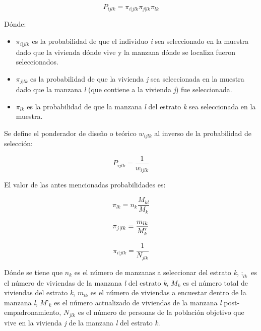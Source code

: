 \documentclass[12pt]{report}
\begin{document}
\begin{equation*}
P_{ijlk}=\pi_{i|jlk} \pi_{j|lk} \pi_{lk}
\end{equation*}

Dónde:
\begin{itemize}[noitemsep]
	\item $\pi_{i|jlk}$ es la probabilidad de que el individuo \textit{i} sea seleccionado en la muestra dado  que la vivienda dónde vive y la manzana dónde se localiza fueron seleccionados.
	\item $\pi_{j|lk}$ es la probabilidad de que la vivienda \textit{j} sea seleccionada en la muestra dado  que la manzana  \textit{l} (que contiene a la vivienda \textit{j}) fue seleccionada.
	\item $\pi_{lk}$ es la probabilidad de que la manzana \textit{l} del estrato \textit{k} sea seleccionada en la muestra.
\end{itemize}	
	
Se define el ponderador de diseño o teórico $w_{ijlk}$ al inverso de la probabilidad de selección:

\begin{equation*}
P_{ijlk}=\frac{1}{w_{ijlk}}
\end{equation*}

El valor de las antes mencionadas probabilidades es:

\begin{equation*}
\pi_{lk}=n_{k}\frac{M_{kl}}{M_{k}}
\end{equation*}	

\begin{equation*}
\pi_{j|lk}=\frac{m_{lk}}{M'_{k}}\\
\end{equation*}
	
\begin{equation*}
\pi_{i|jlk}=\frac{1}{N_{jlk}}
\end{equation*}	
	
Dónde se tiene que $n_{k}$ es el número de manzanas a seleccionar del estrato \textit{k}, $;_{lk}$ es el número de viviendas de la manzana \textit{l} del estrato \textit{k}, $M_{k}$ es el número total de viviendas del estrato \textit{k}, $m_{lk}$ es el número de viviendas a encuestar dentro de la manzana \textit{l}, $M’_{k}$ es el número actualizado de viviendas de la manzana \textit{l} post-empadronamiento, $N_{jlk}$ es el número de personas de la población objetivo que vive en la vivienda \textit{j} de la manzana \textit{l} del estrato \textit{k}.\\	
\end{document}
